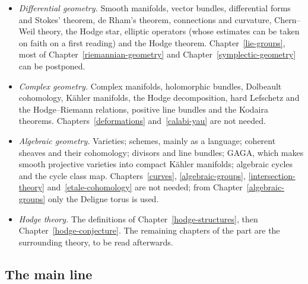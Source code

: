 \begin{itemize}
complex variables, and the Dolbeault--Grothendieck lemma; Banach and Hilbert spaces and compact operators; Sobolev spaces. The geometric measure theory at the end of
Chapter~\ref{measure-theory} and the second half of Chapter~\ref{functional-analysis} are not on the route.
\item \emph{Differential geometry.} Smooth manifolds, vector bundles, differential forms and Stokes' theorem, de Rham's theorem, connections and curvature, Chern--Weil theory,
the Hodge star, elliptic operators (whose estimates can be taken on faith on a first reading) and the Hodge theorem. Chapter~\ref{lie-groups}, most of
Chapter~\ref{riemannian-geometry} and Chapter~\ref{symplectic-geometry} can be postponed.
\item \emph{Complex geometry.} Complex manifolds, holomorphic bundles, Dolbeault cohomology, K\"ahler manifolds, the Hodge decomposition, hard Lefschetz and the Hodge--Riemann
relations, positive line bundles and the Kodaira theorems. Chapters~\ref{deformations} and~\ref{calabi-yau} are not needed.
\item \emph{Algebraic geometry.} Varieties; schemes, mainly as a language; coherent sheaves and their cohomology; divisors and line bundles; GAGA, which makes smooth projective
varieties into compact K\"ahler manifolds; algebraic cycles and the cycle class map. Chapters~\ref{curves}, \ref{algebraic-groups}, \ref{intersection-theory}
and~\ref{etale-cohomology} are not needed; from Chapter~\ref{algebraic-groups} only the Deligne torus is used.
\item \emph{Hodge theory.} The definitions of Chapter~\ref{hodge-structures}, then Chapter~\ref{hodge-conjecture}. The remaining chapters of the part are the
surrounding theory, to be read afterwards.
\end{itemize}

\subsection{The main line}\label{introduction:subsection-main-line}

